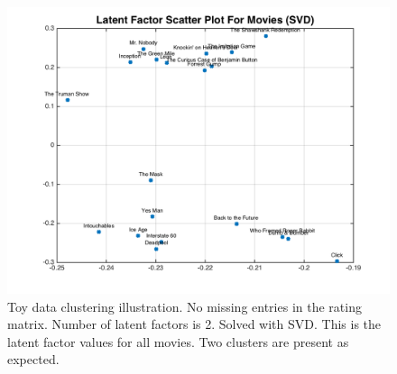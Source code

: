 \documentclass[11pt]{article}
\begin{document}
	\begin{figure}[H]
		\centering		
		\includegraphics[width=\wi]{buff1/svd_mov}
		\caption{Toy data clustering illustration. No missing entries in the rating matrix. Number of latent factors is 2. Solved with SVD. This is the latent factor values for all movies. Two clusters are present as expected.}
		\label{4}		
	\end{figure}
	
%							
	
\end{document}
